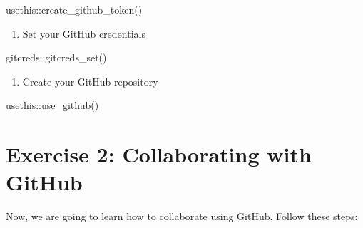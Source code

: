 \documentclass[
  letterpaper,
  DIV=11,
  numbers=noendperiod]{scrartcl}
\newenvironment{Shaded}{\begin{snugshade}}{\end{snugshade}}
\newcommand{\FunctionTok}[1]{\textcolor[rgb]{0.28,0.35,0.67}{#1}}
\newcommand{\NormalTok}[1]{\textcolor[rgb]{0.00,0.23,0.31}{#1}}
\newcommand{\SpecialCharTok}[1]{\textcolor[rgb]{0.37,0.37,0.37}{#1}}
\providecommand{\tightlist}{%
  \setlength{\itemsep}{0pt}\setlength{\parskip}{0pt}}
\begin{document}
\begin{Shaded}
\begin{Highlighting}[]
\NormalTok{usethis}\SpecialCharTok{::}\FunctionTok{create\_github\_token}\NormalTok{()}
\end{Highlighting}
\end{Shaded}

\begin{enumerate}
\def\labelenumi{\arabic{enumi}.}
\setcounter{enumi}{4}
\tightlist
\item
  Set your GitHub credentials
\end{enumerate}

\begin{Shaded}
\begin{Highlighting}[]
\NormalTok{gitcreds}\SpecialCharTok{::}\FunctionTok{gitcreds\_set}\NormalTok{()}
\end{Highlighting}
\end{Shaded}

\begin{enumerate}
\def\labelenumi{\arabic{enumi}.}
\setcounter{enumi}{5}
\tightlist
\item
  Create your GitHub repository
\end{enumerate}

\begin{Shaded}
\begin{Highlighting}[]
\NormalTok{usethis}\SpecialCharTok{::}\FunctionTok{use\_github}\NormalTok{()}
\end{Highlighting}
\end{Shaded}

\section{Exercise 2: Collaborating with
GitHub}\label{exercise-2-collaborating-with-github}

Now, we are going to learn how to collaborate using GitHub. Follow these
steps:
\end{document}
